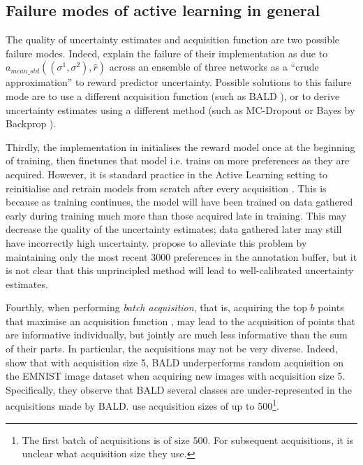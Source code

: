 \documentclass[11pt, a4paper, bibliography=totoc]{report}
\newcommand{\rp}{\hat{r}}
\begin{document}
\subsection{Failure modes of active learning in general} \label{sec:failure1}
The quality of uncertainty estimates and acquisition function are two possible failure modes. Indeed, \cite[p.~6]{Christiano2017} explain the failure of their implementation as due to $ a_{mean\_std}((\sigma^1, \sigma^2), \rp) $ across an ensemble of three networks as a ``crude approximation'' to reward predictor uncertainty. Possible solutions to this failure mode are to use a different acquisition function (such as BALD \cite{Houlsby2011}), or to derive uncertainty estimates using a different method (such as MC-Dropout \cite{Gal2015} or Bayes by Backprop \cite{Blundell2015}).

Thirdly, the implementation in \cite{Christiano2017} initialises the reward model once at the beginning of training, then finetunes that model i.e. trains on more preferences as they are acquired. However, it is standard practice in the Active Learning setting to reinitialise and retrain models from scratch after every acquisition \cite[p.~3]{Kirsch2019a}. This is because as training continues, the model will have been trained on data gathered early during training much more than those acquired late in training. This may decrease the quality of the uncertainty estimates; data gathered later may still have incorrectly high uncertainty. \cite{Christiano2017} propose to alleviate this problem by maintaining only the most recent 3000 preferences in the annotation buffer, but it is not clear that this unprincipled method will lead to well-calibrated uncertainty estimates.

Fourthly, when performing \textit{batch acquisition}, that is, acquiring the top $ b $ points that maximise an acquisition function \cite{Gal2017b}, may lead to the acquisition of points that are informative individually, but jointly are much less informative than the sum of their parts. In particular, the acquisitions may not be very diverse. Indeed, \cite[p.~8]{Kirsch2019a} show that with acquisition size 5, BALD underperforms random acquisition on the EMNIST image dataset \cite{cohen2017emnist} when acquiring new images with acquisition size 5. Specifically, they observe that BALD several classes are under-represented in the acquisitions made by BALD. \cite{Christiano2017} use acquisition sizes of up to 500\footnote{The first batch of acquisitions is of size 500. For subsequent acquisitions, it is unclear what acquisition size they use.}.
\end{document}
